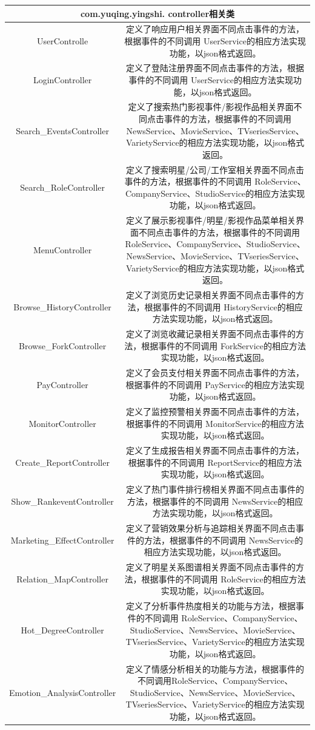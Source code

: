 \begin{tabular}{|c|c|} 
\hline 
\multicolumn{2}{|c|}{com.yuqing.yingshi. controller相关类} \\ 
\hline 
UserControlle&定义了响应用户相关界面不同点击事件的方法，根据事件的不同调用 UserService的相应方法实现功能，以json格式返回。\\
LoginController&定义了登陆注册界面不同点击事件的方法，根据事件的不同调用 UserService的相应方法实现功能，以json格式返回。\\
Search_EventsController&定义了搜索热门影视事件/影视作品相关界面不同点击事件的方法，根据事件的不同调用 NewsService、MovieService、TVseriesService、VarietyService的相应方法实现功能，以json格式返回。\\
Search_RoleController&定义了搜索明星/公司/工作室相关界面不同点击事件的方法，根据事件的不同调用 RoleService、CompanyService、StudioService的相应方法实现功能，以json格式返回。\\
MenuController&定义了展示影视事件/明星/影视作品菜单相关界面不同点击事件的方法，根据事件的不同调用 RoleService、CompanyService、StudioService、NewsService、MovieService、TVseriesService、VarietyService的相应方法实现功能，以json格式返回。\\
Browse_HistoryController&定义了浏览历史记录相关界面不同点击事件的方法，根据事件的不同调用 HistoryService的相应方法实现功能，以json格式返回。\\
Browse_ForkController&定义了浏览收藏记录相关界面不同点击事件的方法，根据事件的不同调用 ForkService的相应方法实现功能，以json格式返回。\\
PayController&定义了会员支付相关界面不同点击事件的方法，根据事件的不同调用 PayService的相应方法实现功能，以json格式返回。\\
MonitorController&定义了监控预警相关界面不同点击事件的方法，根据事件的不同调用 MonitorService的相应方法实现功能，以json格式返回。\\
Create_ReportController&定义了生成报告相关界面不同点击事件的方法，根据事件的不同调用 ReportService的相应方法实现功能，以json格式返回。\\
Show_RankeventController&定义了热门事件排行榜相关界面不同点击事件的方法，根据事件的不同调用 NewsService的相应方法实现功能，以json格式返回。\\
Marketing_EffectController&定义了营销效果分析与追踪相关界面不同点击事件的方法，根据事件的不同调用 NewsService的相应方法实现功能，以json格式返回。\\
Relation_MapController&定义了明星关系图谱相关界面不同点击事件的方法，根据事件的不同调用 RoleService的相应方法实现功能，以json格式返回。\\
Hot_DegreeController&定义了分析事件热度相关的功能与方法，根据事件的不同调用 RoleService、CompanyService、StudioService、NewsService、MovieService、TVseriesService、VarietyService的相应方法实现功能，以json格式返回。\\
Emotion_AnalysisController&定义了情感分析相关的功能与方法，根据事件的不同调用RoleService、CompanyService、StudioService、NewsService、MovieService、TVseriesService、VarietyService的相应方法实现功能，以json格式返回。\\
\hline 
\end{tabular}

